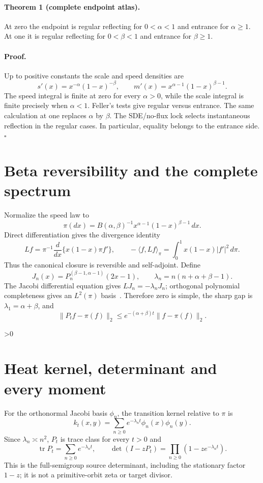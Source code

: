\documentclass[9pt]{extarticle}
\begin{document}
\paragraph{Theorem 1 (complete endpoint atlas).}
At zero the endpoint is regular reflecting for $0<\alpha<1$ and entrance for
$\alpha\ge1$.  At one it is regular reflecting for $0<\beta<1$ and entrance
for $\beta\ge1$.

\paragraph{Proof.}
Up to positive constants the scale and speed densities are
\[
 s'(x)=x^{-\alpha}(1-x)^{-\beta},\qquad
 m'(x)=x^{\alpha-1}(1-x)^{\beta-1}.
\]
The speed integral is finite at zero for every $\alpha>0$, while the scale
integral is finite precisely when $\alpha<1$.  Feller's tests give regular
versus entrance.  The same calculation at one replaces $\alpha$ by $\beta$.
The SDE/no-flux lock selects instantaneous reflection in the regular cases.
In particular, equality belongs to the entrance side. \hfill$\square$

\section{Beta reversibility and the complete spectrum}
Normalize the speed law to
\[
 \pi(dx)=B(\alpha,\beta)^{-1}x^{\alpha-1}(1-x)^{\beta-1}\,dx.
\]
Direct differentiation gives the divergence identity
\begin{equation}\label{eq:div}
 Lf=\pi^{-1}\frac d{dx}\{x(1-x)\pi f'\},\qquad
 -\langle f,Lf\rangle_\pi=\int_0^1x(1-x)|f'|^2\,d\pi .
\end{equation}
Thus the canonical closure is reversible and self-adjoint.  Define
\[
 J_n(x)=P_n^{(\beta-1,\alpha-1)}(2x-1),\qquad
 \lambda_n=n(n+\alpha+\beta-1).
\]
The Jacobi differential equation gives $LJ_n=-\lambda_nJ_n$; orthogonal
polynomial completeness gives an $L^2(\pi)$ basis~\cite{SS12,G79}.  Therefore
zero is simple, the sharp gap is $\lambda_1=\alpha+\beta$, and
\[
 \|P_tf-\pi(f)\|_2\le e^{-(\alpha+\beta)t}
 \|f-\pi(f)\|_2.
\]

\ifnum\CRevisionRound>0
\section{Heat kernel, determinant and every moment}
For the orthonormal Jacobi basis $\phi_n$, the transition kernel relative to
$\pi$ is
\begin{equation}\label{eq:heat}
 k_t(x,y)=\sum_{n\ge0}e^{-\lambda_nt}\phi_n(x)\phi_n(y).
\end{equation}
Since $\lambda_n\asymp n^2$, $P_t$ is trace class for every $t>0$ and
\begin{equation}\label{eq:det}
 \operatorname{tr}P_t=\sum_{n\ge0}e^{-\lambda_nt},\qquad
 \det(I-zP_t)=\prod_{n\ge0}(1-ze^{-\lambda_nt}).
\end{equation}
This is the full-semigroup source determinant, including the stationary
factor $1-z$; it is not a primitive-orbit zeta or target divisor.
\end{document}
